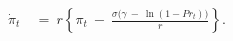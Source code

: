 \begin{equation}
\begin{split}
    \dot{\pi}_{t} \
    & = \ r \left\{ \pi_{t} \ - \ \frac{\sigma \big( \gamma \ - \ \ln(1 - Pr_{t}) \big)}{r} \right\}.
\end{split}
\label{Equation:Social-Planners-Problem_Growth-Rate-of-Costate-Variable}
\end{equation}
